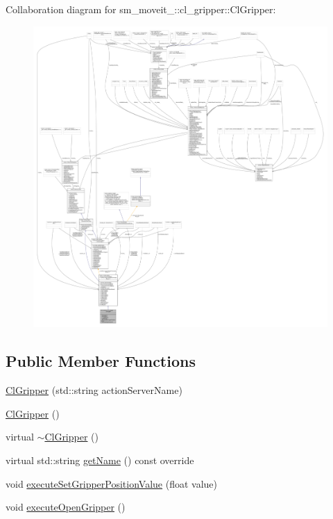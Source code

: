 Collaboration diagram for sm\+\_\+moveit\+\_\+:\+:cl\+\_\+gripper\+:\+:Cl\+Gripper\+:
\nopagebreak
\begin{figure}[H]
\begin{center}
\leavevmode
\includegraphics[width=350pt]{classsm__moveit__2_1_1cl__gripper_1_1ClGripper__coll__graph}
\end{center}
\end{figure}
\subsection*{Public Member Functions}
\begin{DoxyCompactItemize}
\item 
\hyperlink{classsm__moveit__2_1_1cl__gripper_1_1ClGripper_a05cff520a62478c4b8c3a6eed263aa47}{Cl\+Gripper} (std\+::string action\+Server\+Name)
\item 
\hyperlink{classsm__moveit__2_1_1cl__gripper_1_1ClGripper_a7fe8594873955c0c132d55d078e40c66}{Cl\+Gripper} ()
\item 
virtual \hyperlink{classsm__moveit__2_1_1cl__gripper_1_1ClGripper_a515ba23dd7e4f808ae32c2ce0baad7b0}{$\sim$\+Cl\+Gripper} ()
\item 
virtual std\+::string \hyperlink{classsm__moveit__2_1_1cl__gripper_1_1ClGripper_a080203a4c344166dfebd84c02422a707}{get\+Name} () const override
\item 
void \hyperlink{classsm__moveit__2_1_1cl__gripper_1_1ClGripper_a5a00371f3dda12ea2573852fab9bcf47}{execute\+Set\+Gripper\+Position\+Value} (float value)
\item 
void \hyperlink{classsm__moveit__2_1_1cl__gripper_1_1ClGripper_a56b405f6c1352d7f7bb41cbd69d4ae80}{execute\+Open\+Gripper} ()
\end{DoxyCompactItemize}
